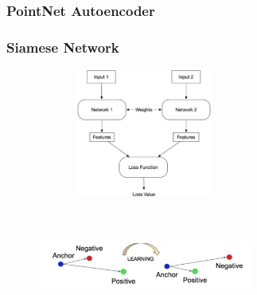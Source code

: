 \subsubsection{PointNet Autoencoder}
\subsubsection{Siamese Network}
\begin{figure}
  \centering
  \begin{minipage}[t]{.45\textwidth}
    \centering
    \includegraphics[width=200pt,height=120pt]{pictures/siamese_network.png}
    \label{fig:siamese_network}
  \end{minipage}%
  \hspace{1cm}
  \begin{minipage}[t]{.45\textwidth}
    \centering
    \includegraphics[width=200pt,height=100pt]{pictures/triplet_loss.PNG}
    \label{fig:triplet_loss}
  \end{minipage}
\end{figure}
